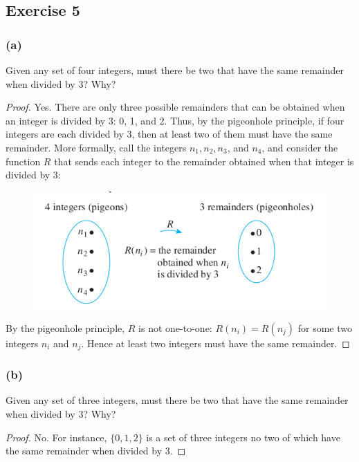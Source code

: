 \documentclass[14pt]{extarticle}
\begin{document}
\subsection{Exercise 5}
\subsubsection{(a)}
Given any set of four integers, must there be two that have the same remainder when divided by 3? Why?

\begin{proof}
     Yes. There are only three possible remainders that can be obtained when an integer is divided by 3: 0, 1, and 2.
     Thus, by the pigeonhole principle, if four integers are each divided by 3, then at least two of them must have the
     same remainder. More formally, call the integers \(n_1, n_2, n_3\), and \(n_4\), and consider the function \(R\)
     that sends each integer to the remainder obtained when that integer is divided by 3:

     \begin{figure}[ht!]
          \centering
          \includegraphics[scale=0.4]{../images/9.4.5.a.png}
     \end{figure}

     By the pigeonhole principle, \(R\) is not one-to-one: \(R(n_i) = R(n_j)\) for some two integers \(n_i\) and
     \(n_j\). Hence at least two integers must have the same remainder.
\end{proof}

\subsubsection{(b)}
Given any set of three integers, must there be two that have the same remainder when divided by 3? Why?

\begin{proof}
     No. For instance, \(\{0, 1, 2\}\) is a set of three integers no two of which have the same remainder when
     divided by 3.
\end{proof}
\end{document}
